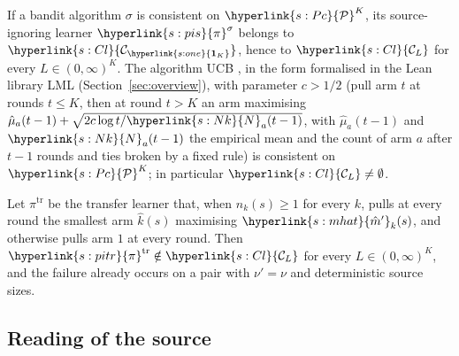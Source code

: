 \documentclass[11pt]{article}
\newcommand{\dt}[1]{\hypertarget{#1}{}}
\newcommand{\sy}[2]{\hyperlink{#1}{#2}}
\newcommand{\Pc}{\sy{s:Pc}{\mathcal{P}}}
\newcommand{\ClL}[1][L]{\sy{s:Cl}{\mathcal{C}_{#1}}}
\newcommand{\one}{\sy{s:one}{\mathbf{1}_{K}}}
\newcommand{\pitr}{\sy{s:pitr}{\pi}^{\mathrm{tr}}}
\newcommand{\Nc}{\sy{s:Nk}{N}}
\newcommand{\mhat}{\sy{s:mhat}{\hat m'}}
\newcommand{\pis}{\sy{s:pis}{\pi}^{\sigma}}
\begin{document}
\begin{proposition}\label{prop:witness}
If a bandit algorithm $\sigma$ is consistent on $\Pc^K$, its source-ignoring learner $\pis$
belongs to $\ClL[\one]$, hence to $\ClL$ for every $L\in(0,\infty)^K$. The algorithm UCB
\citep{ACF02}, in the form formalised in the Lean library LML (Section~\ref{sec:overview}), with
parameter $c>1/2$ (pull arm $t$ at rounds
$t\le K$, then at round $t>K$ an arm maximising
$\hat\mu_a(t-1)+\sqrt{2c\log t/\Nc_a(t-1)}$, with $\hat\mu_a(t-1)$ and $\Nc_a(t-1)$ the empirical mean
and the count of arm $a$ after $t-1$ rounds and ties broken by a fixed rule) is consistent on
$\Pc^K$; in particular $\ClL\ne\emptyset$.
\end{proposition}

\begin{proposition}\label{prop:exclusion}
Let \dt{s:pitr}$\pi^{\mathrm{tr}}$ be the transfer learner that, when $n_k(s)\ge1$ for every $k$,
pulls at every round the smallest arm $\hat k(s)$ maximising $\mhat_k(s)$, and otherwise pulls
arm $1$ at every round. Then $\pitr\notin\ClL$ for every $L\in(0,\infty)^K$, and the failure already
occurs on a pair with $\nu'=\nu$ and deterministic source sizes.
\end{proposition}

\subsection{Reading of the source}\label{sec:reading}
\end{document}
